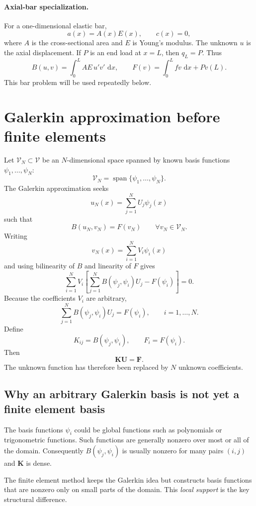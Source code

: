 \documentclass[11pt]{article}
\newcommand{\dd}{\,\mathrm{d}}
\newcommand{\V}{\mathcal{V}}
\newcommand{\bU}{\mathbf{U}}
\newcommand{\bK}{\mathbf{K}}
\newcommand{\bF}{\mathbf{F}}
\begin{document}
\paragraph{Axial-bar specialization.}
For a one-dimensional elastic bar,
\[
a(x)=A(x)E(x),\qquad c(x)=0,
\]
where $A$ is the cross-sectional area and $E$ is Young's modulus. The unknown
$u$ is the axial displacement. If $P$ is an end load at $x=L$, then $q_L=P$.
Thus
\[
B(u,v)=\int_0^L AE\,u'v'\,\dd x,
\qquad
F(v)=\int_0^L fv\,\dd x+Pv(L).
\]
This bar problem will be used repeatedly below.

\section{Galerkin approximation before finite elements}

Let $\V_N\subset\V$ be an $N$-dimensional space spanned by known basis
functions $\psi_1,\ldots,\psi_N$:
\[
\V_N=\operatorname{span}\{\psi_1,\ldots,\psi_N\}.
\]
The Galerkin approximation seeks
\[
u_N(x)=\sum_{j=1}^N U_j\psi_j(x)
\]
such that
\begin{equation}
B(u_N,v_N)=F(v_N)
\qquad\forall v_N\in\V_N.
\label{eq:galerkin}
\end{equation}
Writing
\[
v_N(x)=\sum_{i=1}^N V_i\psi_i(x)
\]
and using bilinearity of $B$ and linearity of $F$ gives
\[
\sum_{i=1}^N V_i
\left[
\sum_{j=1}^N B(\psi_j,\psi_i)U_j-F(\psi_i)
\right]=0.
\]
Because the coefficients $V_i$ are arbitrary,
\[
\sum_{j=1}^N B(\psi_j,\psi_i)U_j=F(\psi_i),
\qquad i=1,\ldots,N.
\]
Define
\[
K_{ij}=B(\psi_j,\psi_i),
\qquad
F_i=F(\psi_i).
\]
Then
\begin{equation}
\boxed{\bK\bU=\bF.}
\label{eq:global-galerkin}
\end{equation}
The unknown function has therefore been replaced by $N$ unknown coefficients.

\subsection*{Why an arbitrary Galerkin basis is not yet a finite element basis}

The basis functions $\psi_i$ could be global functions such as polynomials or
trigonometric functions. Such functions are generally nonzero over most or all
of the domain. Consequently $B(\psi_j,\psi_i)$ is usually nonzero for many
pairs $(i,j)$ and $\bK$ is dense.

The finite element method keeps the Galerkin idea but constructs basis
functions that are nonzero only on small parts of the domain. This
\emph{local support} is the key structural difference.
\end{document}

